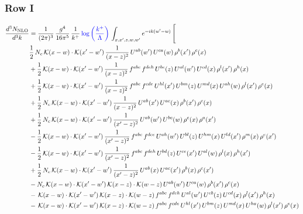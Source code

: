 \documentclass[9pt]{article}
\numberwithin{equation}{section}
\begin{document}
\subsubsection{Row I}
\begin{align}
\frac{d^{3}N_{\mathrm{NLO}}}{d^{3}k} & = \frac{1}{(2\pi)^{3}}\,\frac{g^{4}}{16\pi^{5}}\,\frac{1}{k^{+}}\,{\color{blue}\log{\left(\frac{k^{+}}{\Lambda}\right)}}\,\int_{x,x',z,w,w'}e^{-ik(w'-w)}\,\Bigg[\notag\\ & \frac{1}{2}\,N_{c}\,\mathcal{K}(x-w)\cdot\mathcal{K}(x'-w')\,\frac{1}{(x-z)^{2}}\,U^{ab}(w')\,U^{ca}(w)\,\rho^{b}(x')\,\rho^{c}(x)\notag\\
& +\frac{1}{2}\,\mathcal{K}(x-w)\cdot\mathcal{K}(x'-w')\,\frac{1}{(x-z)^{2}}\,f^{abc}\,f^{deh}\,U^{be}(z)\,U^{al}(w')\,U^{cd}(x)\,\rho^{l}(x')\,\rho^{h}(x)\notag\\
& +\frac{1}{2}\,\mathcal{K}(x-w)\cdot\mathcal{K}(x'-w')\,\frac{1}{(x-z)^{2}}\,f^{abc}\,f^{cde}\,U^{hl}(x')\,U^{bm}(z)\,U^{md}(x)\,U^{ah}(w)\,\rho^{l}(x')\,\rho^{e}(x)\notag\\
& +\frac{1}{2}\,N_{c}\,\mathcal{K}(x-w)\cdot\mathcal{K}(x'-w')\,\frac{1}{(x-z)^{2}}\,U^{ab}(x')\,U^{ac}(x)\,\rho^{b}(x')\,\rho^{c}(x)\notag\\
& +\frac{1}{2}\,N_{c}\,\mathcal{K}(x-w)\cdot\mathcal{K}(x'-w')\,\frac{1}{(x'-z)^{2}}\,U^{ab}(w')\,U^{bc}(w)\,\rho^{c}(x)\,\rho^{a}(x')\notag\\
& -\frac{1}{2}\,\mathcal{K}(x-w)\cdot\mathcal{K}(x'-w')\,\frac{1}{(x'-z)^{2}}\,f^{abc}\,f^{dce}\,U^{ah}(w')\,U^{bl}(z)\,U^{hm}(x)\,U^{ld}(x')\,\rho^{m}(x)\,\rho^{e}(x')\notag\\
& -\frac{1}{2}\,\mathcal{K}(x-w)\cdot\mathcal{K}(x'-w')\,\frac{1}{(x'-z)^{2}}\,f^{abc}\,f^{deh}\,U^{bd}(z)\,U^{ce}(x')\,U^{al}(w)\,\rho^{l}(x)\,\rho^{h}(x')\notag\\
& +\frac{1}{2}\,N_{c}\,\mathcal{K}(x-w)\cdot\mathcal{K}(x'-w')\,\frac{1}{(x'-z)^{2}}\,U^{ab}(x)\,U^{ac}(x')\,\rho^{b}(x)\,\rho^{c}(x')\notag\\
& -N_{c}\,\mathcal{K}(x-w)\cdot\mathcal{K}(x'-w')\,\mathcal{K}(x-z)\cdot\mathcal{K}(w-z)\,U^{ab}(w')\,U^{ca}(w)\,\rho^{b}(x')\,\rho^{c}(x)\notag\\
& -\,\mathcal{K}(x-w)\cdot\mathcal{K}(x'-w')\,\mathcal{K}(x-z)\cdot\mathcal{K}(w-z)\,f^{abc}\,f^{deh}\,U^{al}(w')\,U^{eb}(z)\,U^{cd}(x)\,\rho^{l}(x')\,\rho^{h}(x)\notag\\
& -\,\mathcal{K}(x-w)\cdot\mathcal{K}(x'-w')\,\mathcal{K}(x-z)\cdot\mathcal{K}(w-z)\,f^{abc}\,f^{cde}\,U^{hl}(x')\,U^{bm}(z)\,U^{md}(x)\,U^{ha}(w)\,\rho^{l}(x')\,\rho^{e}(x)\notag\\

\end{align}
\end{document}

